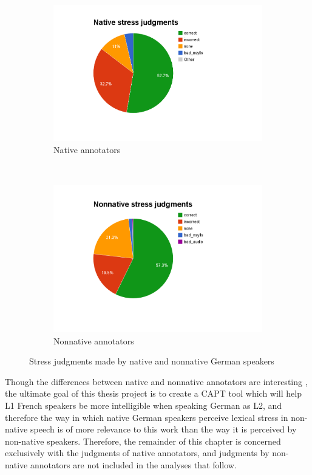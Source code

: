 		
			\begin{figure}[htb]
				\centering
				\begin{subfigure}[b]{.5\textwidth}
					\centering
					\includegraphics[width=\textwidth]{img/annotation/nativePie}
					\caption{Native annotators}
					\label{fig:l1pies:native}
				\end{subfigure}%
				~
				\begin{subfigure}[b]{.5\textwidth}
					\centering
					\includegraphics[width=\textwidth]{img/annotation/nonnativePie}
					\caption{Nonnative annotators}
					\label{fig:l1pies:nonnative}
				\end{subfigure}%
				\caption{Stress judgments made by native and nonnative German speakers}
				\label{fig:l1pies}
			\end{figure}
			
		Though the differences between native and nonnative annotators are interesting , the ultimate goal of this thesis project is to create a CAPT tool which will help L1 French speakers be more intelligible when speaking German as L2, and therefore the way in which native German speakers perceive lexical stress in non-native speech is of more relevance to this work than the way it is perceived by non-native speakers. Therefore, the remainder of this chapter is concerned exclusively with the judgments of native annotators, and judgments by non-native annotators are not included in the analyses that follow.
			
